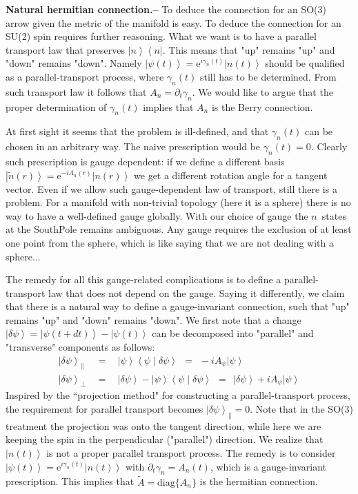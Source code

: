 \documentclass[onecolumn,fleqn]{revtex4}
\newcommand{\eexp}{\mathrm{e}^}
\newcommand{\bra}[1]{\left\langle #1 \right|}
\newcommand{\ket}[1]{\left| #1 \right\rangle}
\newcommand{\Braket}[2]{\left\langle #1 \middle| #2 \right\rangle}
\newcommand{\beq}{\begin{eqnarray}}
\newcommand{\eeq}{\end{eqnarray}}
\begin{document}
{\bf Natural hermitian connection.-- } 
To deduce the connection for an SO(3) arrow given the metric of the manifold is easy.
To deduce the connection for an SU(2) spin requires further reasoning. 
What we want is to have a  parallel transport law that preserves $\ket{n}\!\bra{n}$. 
This means that "up" remains "up" and "down" remains "down". 
Namely ${\ket{\psi(t)} = \eexp{i\gamma_n(t)} \ket{n(t)}}$ should be qualified 
as a parallel-transport process, where $\gamma_n(t)$ still has to be determined. 
From such transport law it follows that $A_n=\partial_t\gamma_n$. 
We would like to argue that the proper determination of $\gamma_n(t)$ implies 
that $A_n$ is the Berry connection.  

At first sight it seems that the problem is ill-defined, and that $\gamma_n(t)$ 
can be chosen in an arbitrary way. The naive prescription would be ${\gamma_n(t)=0}$. 
Clearly such prescription is gauge dependent: 
if we define a different basis ${ \ket{\tilde{n}(r)}=\eexp{-i\Lambda_n(r)} \ket{n(r)} }$ 
we get a different rotation angle for a tangent vector.    
Even if we allow such gauge-dependent law of transport, still there is a problem. 
For a manifold with non-trivial topology (here it is a sphere) 
there is no way to have a well-defined gauge globally.
With our choice of gauge the $n$~states at the SouthPole remains ambiguous.  
Any gauge requires the exclusion of at least one point from the sphere, 
which is like saying that we are not dealing with a sphere...

The remedy for all this gauge-related complications is to define 
a parallel-transport law that does not depend on the gauge.
Saying it differently, we claim that there is a natural way to define a gauge-invariant connection, 
such that "up" remains "up" and "down" remains "down".  
We first note that a change ${\ket{\delta\psi} = \ket{\psi(t{+}dt)}- \ket{\psi(t)}}$
can be decomposed into "parallel" and "transverse" components as follows:
\beq
\ket{\delta\psi}_{\parallel}  \ \ &=& \ \ \ket{\psi}\Braket{\psi}{\delta \psi} \ \ = \ \ -iA_{\psi} \ket{\psi} \\  
\ket{\delta \psi}_{\perp} \ \ &=& \ \ \ket{\delta \psi} -  \ket{\psi}\Braket{\psi}{\delta \psi} \ \ = \ \ \ket{\delta \psi} + iA_{\psi} \ket{\psi}
\eeq  
Inspired by the ``projection method" for constructing a parallel-transport process,   
the requirement for parallel transport becomes ${\ket{\delta\psi}_{\parallel}=0}$.
Note that in the SO(3) treatment the projection was onto the tangent direction, 
while here we are keeping the spin in the perpendicular ("parallel") direction.   
We realize that $\ket{n(t)}$ is not a proper parallel transport process. 
The remedy is to consider ${\ket{\psi(t)} = \eexp{i\gamma_n(t)} \ket{n(t)}}$
with ${\partial_t\gamma_n = A_n(t)}$, which is a gauge-invariant prescription.   
This implies that $\tilde{A}=\text{diag}\{A_n\}$ is the hermitian connection. 
\end{document}

